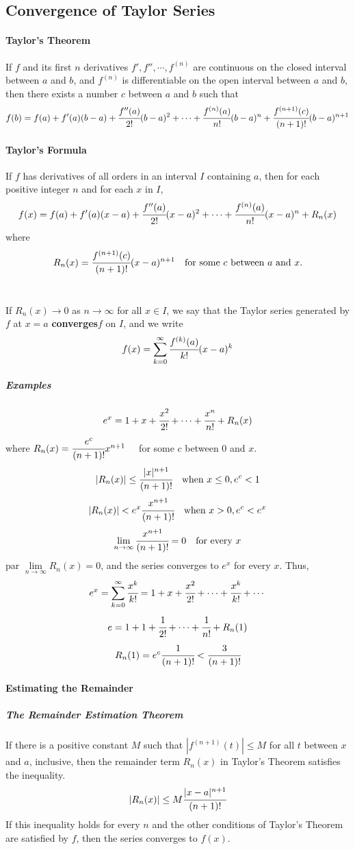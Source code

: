 \documentclass{article}
\begin{document}
        \subsection{Convergence of Taylor Series}
            \paragraph{Taylor's Theorem} If $f$ and its first $n$ derivatives $f',f'',\cdots,f^{(n)}$ are continuous on the closed interval between $a$ and $b$, and $f^{(n)}$ is differentiable on the open interval between $a$ and $b$, then there exists a number $c$ between $a$ and $b$ such that
            \[f(b)=f(a)+f'(a)(b-a)+\cfrac{f''(a)}{2!}(b-a)^2+\cdots+\cfrac{f^{(n)}(a)}{n!}(b-a)^n+\cfrac{f^{(n+1)}(c)}{(n+1)!}(b-a)^{n+1}\]
            \paragraph{Taylor's Formula}
            If $f$ has derivatives of all orders in an interval $I$ containing $a$, then for each positive integer $n$ and for each $x$ in $I$,
            \[f(x)=f(a)+f'(a)(x-a)+\cfrac{f''(a)}{2!}(x-a)^2+\cdots+\cfrac{f^{(n)}(a)}{n!}(x-a)^n+R_n(x)\]
            where
            \[R_n(x)=\cfrac{f^{(n+1)}(c)}{(n+1)!}(x-a)^{n+1}\quad \text{for some $c$ between $a$ and $x$.}\]\\
            \par If $R_n(x)\to 0$ as $n\to \infty$ for all $x\in I$, we say that the Taylor series generated by $f$ at $x=a$ \textbf{converges}$f$ on $I$, and we write
            \[f(x)=\sum_{k=0}^\infty\cfrac{f^{(k)}(a)}{k!}(x-a)^k\]
            \subparagraph{Examples}
            \[e^x=1+x+\cfrac{x^2}{2!}+\cdots+\cfrac{x^n}{n!}+R_n(x)\]
            where $R_n(x)=\cfrac{e^c}{(n+1)!} x^{n+1}\quad$ for some $c$ between 0 and $x$. 
            \[|R_n(x)|\le \cfrac{|x|^{n+1}}{(n+1)!}\quad \text{when }x\le 0, e^c<1\]
            \[|R_n(x)|<e^x\cfrac{x^{n+1}}{(n+1)!}\quad \text{when } x>0, e^c<e^x\]
            \[\lim\limits_{n\to \infty} \cfrac{x^{n+1}}{(n+1)!}=0\quad \text{for every $x$}\]
            par $\lim\limits_{n\to\infty} R_n(x)=0$, and the series converges to $e^x$ for every $x$. Thus,
            \[e^x=\sum_{k=0}^\infty\cfrac{x^k}{k!}=1+x+\cfrac{x^2}{2!}+\cdots+\cfrac{x^k}{k!}+\cdots\]
            \[e=1+1+\cfrac{1}{2!}+\cdots+\cfrac{1}{n!}+R_n(1)\]
            \[R_n(1)=e^c\cfrac{1}{(n+1)!}<\cfrac{3}{(n+1)!}\]
            \paragraph{Estimating the Remainder}
                \subparagraph{The Remainder Estimation Theorem} If there is a positive constant $M$ such that $|f^{(n+1)}(t)|\le M$ for all $t$ between $x$ and $a$, inclusive, then the remainder term $R_n(x)$ in Taylor's Theorem satisfies the inequality.
                \[|R_n(x)|\le M\cfrac{|x-a|^{n+1}}{(n+1)!}\]
                If this inequality holds for every $n$ and the other conditions of Taylor's Theorem are satisfied by $f$, then the series converges to $f(x)$.
\end{document}

